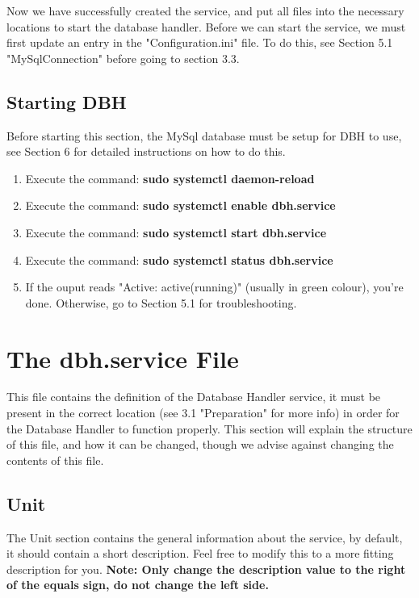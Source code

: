 \documentclass[letterpaper]{article}
\begin{document}
	Now we have successfully created the service, and put all files into the necessary locations to start the database handler. Before we can start the service, we must first update an entry in the "Configuration.ini" file. To do this, see Section 5.1 "MySqlConnection" before going to section 3.3.
	
	\subsection{Starting DBH}
	Before starting this section, the MySql database must be setup for DBH to use, see Section 6 for detailed instructions on how to do this.
	
	\begin{enumerate}
		\item Execute the command: \textbf{sudo systemctl daemon-reload}
		\item Execute the command: \textbf{sudo systemctl enable dbh.service}
		\item Execute the command: \textbf{sudo systemctl start dbh.service}
		\item Execute the command: \textbf{sudo systemctl status dbh.service}
		\item If the ouput reads "Active: active(running)" (usually in green colour), you're done. Otherwise, go to Section 5.1 for troubleshooting.
	\end{enumerate}
	
	\section{The dbh.service File}
	This file contains the definition of the Database Handler service, it must be present in the correct location (see 3.1 "Preparation" for more info) in order for the Database Handler to function properly. This section will explain the structure of this file, and how it can be changed, though we advise against changing the contents of this file.
	
	\subsection{Unit}
	The Unit section contains the general information about the service, by default, it should contain a short description. Feel free to modify this to a more fitting description for you. \textbf{Note: Only change the description value to the right of the equals sign, do not change the left side.}
	
\end{document}
